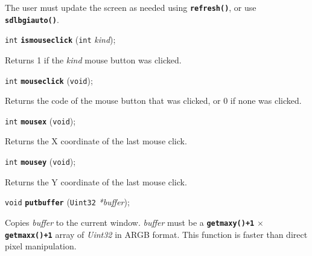 \documentclass[a4paper,12pt]{article}
\newcommand{\V}{\texttt{void}}      %
\newcommand{\I}{\texttt{int}}       %
\newcommand{\Ut}{\texttt{Uint32}}   %
\newcommand{\func}[1]{\textbf{\texttt{#1}}}  %
\newcommand{\A}[1]{\emph{#1}}       %
\newenvironment{bgi}
{ %
  \begin{snugshade}
}
{ %
  \end{snugshade}
}
\begin{document}
The user must update the screen as needed using \func{refresh()}, or
use \func{sdlbgiauto()}.


\label{sec:ismouseclick}

\begin{bgi}
\I{} \func{ismouseclick} (\I{} \A{kind});
\end{bgi}

Returns 1 if the \A{kind} mouse button was clicked.


\label{sec:mouseclick}

\begin{bgi}
\I{} \func{mouseclick} (\V{});
\end{bgi}

Returns the code of the mouse button that was clicked, or 0 if none
was clicked.


\label{sec:mousex}

\begin{bgi}
\I{} \func{mousex} (\V{});
\end{bgi}

Returns the X coordinate of the last mouse click.


\label{sec:mousey}

\begin{bgi}
\I{} \func{mousey} (\V{});
\end{bgi}

Returns the Y coordinate of the last mouse click.


\label{sec:putbuffer}

\begin{bgi}
\V{} \func{putbuffer} (\Ut{} \A{*buffer});
\end{bgi}

Copies \A{buffer} to the current window. \A{buffer} must be a
\func{getmaxy()+1} $\times$ \func{getmaxx()+1} array of \A{Uint32} in
ARGB format. This function is faster than direct pixel manipulation.

\end{document}
